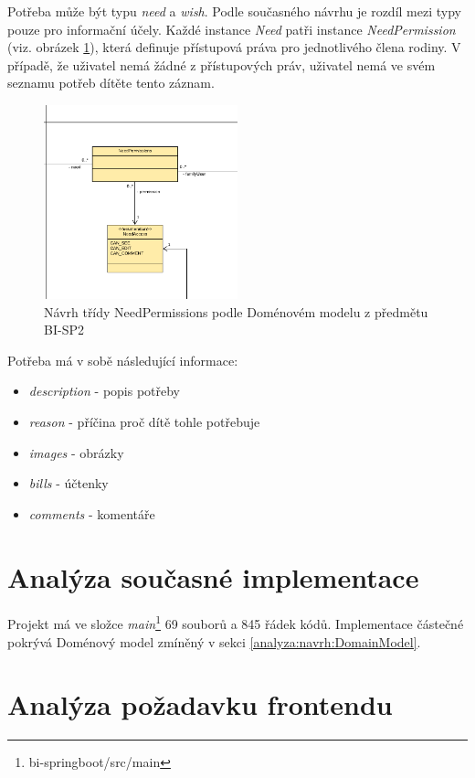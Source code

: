         Potřeba může být typu \textit{need} a \textit{wish}. Podle současného návrhu je rozdíl mezi typy pouze pro informační účely. Každé instance \textit{Need} patři instance \textit{NeedPermission} (viz. obrázek \ref{image:NeedPermissions1}), která definuje přístupová práva pro jednotlivého člena rodiny. V případě, že uživatel nemá žádné z přístupových práv, uživatel nemá ve svém seznamu potřeb dítěte tento záznam.
        \begin{figure}\centering
	        \includegraphics[width=0.5\textwidth]{pdfs/NeedPermissions1}
	        \caption[Návrh Rolí]{Návrh třídy NeedPermissions podle Doménovém modelu z předmětu BI-SP2}\label{image:NeedPermissions1}
        \end{figure}
        Potřeba má v sobě následující informace:
        \begin{itemize}
            \item \textit{description} - popis potřeby
            \item \textit{reason} - příčina proč dítě tohle potřebuje
            \item \textit{images} - obrázky
            \item \textit{bills} - účtenky
            \item \textit{comments} - komentáře
        \end{itemize}
     
    \section{Analýza současné implementace}\label{analyza:soucasnaImplementace}
        Projekt má ve složce \textit{main}\footnote{bi-springboot/src/main} 69 souborů a 845 řádek kódů. Implementace částečné pokrývá Doménový model zmíněný v sekci \ref{analyza:navrh:DomainModel}. 
    
    \section{Analýza požadavku frontendu}
    

